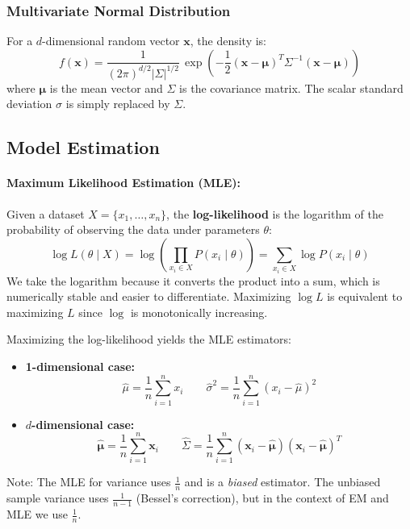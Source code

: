 \documentclass{article}
\begin{document}
\subsubsection{Multivariate Normal Distribution}
For a $d$-dimensional random vector $\mathbf{x}$, the density is:
\[
  f(\mathbf{x})
  = \frac{1}{(2\pi)^{d/2}|\Sigma|^{1/2}}\,
    \exp\!\left(-\frac{1}{2}(\mathbf{x}-\boldsymbol{\mu})^T
    \Sigma^{-1}(\mathbf{x}-\boldsymbol{\mu})\right)
\]
where $\boldsymbol{\mu}$ is the mean vector and $\Sigma$ is the covariance matrix.
The scalar standard deviation $\sigma$ is simply replaced by $\Sigma$.

\subsection{Model Estimation}

\paragraph{Maximum Likelihood Estimation (MLE):}
Given a dataset $X = \{x_1, \dots, x_n\}$, the \textbf{log-likelihood} is the logarithm of the
probability of observing the data under parameters $\theta$:
\[
  \log L(\theta \mid X)
  = \log\!\left(\prod_{x_i \in X} P(x_i \mid \theta)\right)
  = \sum_{x_i \in X} \log P(x_i \mid \theta)
\]
We take the logarithm because it converts the product into a sum, which is numerically stable
and easier to differentiate. Maximizing $\log L$ is equivalent to maximizing $L$ since $\log$
is monotonically increasing.

\medskip\noindent
Maximizing the log-likelihood yields the MLE estimators:

\begin{itemize}
  \item \textbf{1-dimensional case:}
  \[
    \hat{\mu} = \frac{1}{n}\sum_{i=1}^{n} x_i
    \qquad
    \hat{\sigma}^2 = \frac{1}{n}\sum_{i=1}^{n}(x_i - \hat{\mu})^2
  \]
  \item \textbf{$d$-dimensional case:}
  \[
    \hat{\boldsymbol{\mu}} = \frac{1}{n}\sum_{i=1}^{n} \mathbf{x}_i
    \qquad
    \hat{\Sigma} = \frac{1}{n}\sum_{i=1}^{n}
                  (\mathbf{x}_i - \hat{\boldsymbol{\mu}})
                  (\mathbf{x}_i - \hat{\boldsymbol{\mu}})^T
  \]
\end{itemize}

\noindent
Note: The MLE for variance uses $\tfrac{1}{n}$ and is a \emph{biased} estimator.
The unbiased sample variance uses $\tfrac{1}{n-1}$ (Bessel's correction), but in the
context of EM and MLE we use $\tfrac{1}{n}$.
\end{document}
